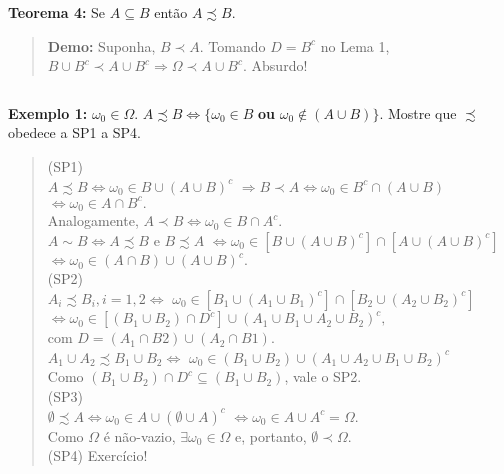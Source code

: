 \documentclass[
]{book}
\begin{document}
\(~\)

\textbf{Teorema 4:}
Se \(A \subseteq B\) então \(A \precsim B\).

\begin{quote}
\textbf{Demo:} Suponha, \(B \prec A\). Tomando \(D=B^c\) no Lema 1, \(B \cup B^c \prec A \cup B^c \Rightarrow \Omega \prec A \cup B^c\). Absurdo!
\end{quote}

\(~\)

\textbf{Exemplo 1:} \(\omega_0 \in \Omega\). \(A \precsim B \Leftrightarrow \{\omega_0 \in B\) \textbf{ou} \(\omega_0 \notin (A \cup B)\}\). Mostre que \(\precsim\) obedece a SP1 a SP4.

\begin{quote}
(SP1)\\
\(A \precsim B \Leftrightarrow \omega_0 \in B \cup (A \cup B)^c\)
\(\Rightarrow B \prec A \Leftrightarrow \omega_0 \in B^c \cap (A \cup B)\)
\(\Leftrightarrow \omega_0 \in A \cap B^c.\)\\
Analogamente, \(A \prec B \Leftrightarrow \omega_0 \in B \cap A^c.\)\\
\(A \sim B \Leftrightarrow A \precsim B\) e \(B \precsim A\)
\(\Leftrightarrow \omega_0 \in [B \cup (A \cup B)^c] \cap [A \cup (A \cup B)^c]\)
\(\Leftrightarrow \omega_0 \in (A \cap B) \cup (A \cup B)^c.\)\\
\(~\)\\
(SP2)\\
\(A_i \precsim B_i , i=1,2 \Leftrightarrow\) \(\omega_0 \in [B_1 \cup (A_1 \cup B_1)^c] \cap [B_2 \cup (A_2 \cup B_2)^c]\) \(\Leftrightarrow \omega_0 \in [(B_1 \cup B_2) \cap D^c] \cup (A_1 \cup B_1 \cup A_2 \cup B_2)^c,\)\\
com \(D = (A_1 \cap B2) \cup (A_2 \cap B1).\)\\
\(A_1 \cup A_2 \precsim B_1 \cup B_2 \Leftrightarrow\) \(\omega_0 \in (B_1 \cup B_2) \cup (A_1 \cup A_2 \cup B_1 \cup B_2)^c\)\\
Como \((B_1 \cup B_2) \cap D^c \subseteq (B_1 \cup B_2)\), vale o SP2.\\
\(~\)\\
(SP3)\\
\(\emptyset \precsim A \Leftrightarrow \omega_0 \in A \cup (\emptyset \cup A)^c\) \(\Leftrightarrow \omega_0 \in A \cup A^c = \Omega.\)\\
Como \(\Omega\) é não-vazio, \(\exists \omega_0 \in \Omega\) e, portanto, \(\emptyset \prec \Omega\).\\
\(~\)\\
(SP4) Exercício!
\end{quote}
\end{document}
